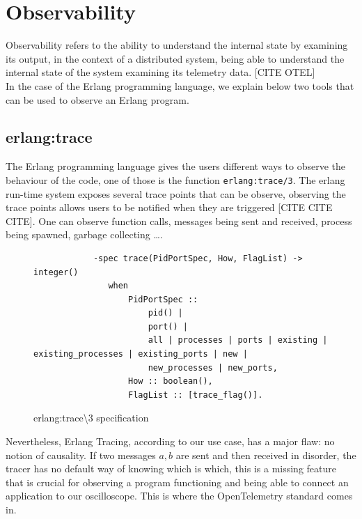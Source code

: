 \section{Observability}
        Observability refers to the ability to understand the internal state by examining its output, in the context of a distributed system, being able to understand the internal state of the system examining its telemetry data. [CITE OTEL] \\
    In the case of the Erlang programming language, we explain below two tools that can be used to observe an Erlang program.
    \subsection{erlang:trace}
        The Erlang programming language gives the users different ways to observe the behaviour of the code, one of those is the function \texttt{erlang:trace/3}. The erlang run-time system exposes several trace points that can be observe, observing the trace points allows users to be notified when they are triggered [CITE CITE CITE]. One can observe function calls, messages being sent and received, process being spawned, garbage collecting \dots. 
        \begin{figure}[!ht]
        \centering
        \begin{verbatim}
            -spec trace(PidPortSpec, How, FlagList) -> integer()
               when
                   PidPortSpec ::
                       pid() |
                       port() |
                       all | processes | ports | existing | existing_processes | existing_ports | new |
                       new_processes | new_ports,
                   How :: boolean(),
                   FlagList :: [trace_flag()].
        \end{verbatim}
        \caption{erlang:trace\textbackslash3 specification}
\end{figure}

    Nevertheless, Erlang Tracing, according to our use case, has a major flaw: no notion of causality. If two messages $a, b$ are sent and then received in disorder, the tracer has no default way of knowing which is which, this is a missing feature that is crucial for observing a program functioning and being able to connect an application to our oscilloscope.  This is where the OpenTelemetry standard comes in.

